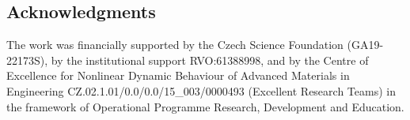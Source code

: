 \documentclass[number,review]{elsarticle}
\def\myParts{03_parts}
\begin{document}
\linenumbers








\subsection*{Acknowledgments}
{\small{
The work was financially supported by the Czech Science Foundation (GA19-22173S), by the institutional support RVO:61388998, and by the Centre of Excellence for Nonlinear Dynamic Behaviour of Advanced Materials in Engineering CZ.02.1.01/0.0/0.0/15\_003/0000493 (Excellent Research Teams) in the framework of Operational Programme Research, Development and Education.
}}






\appendix

% 
\end{document}
